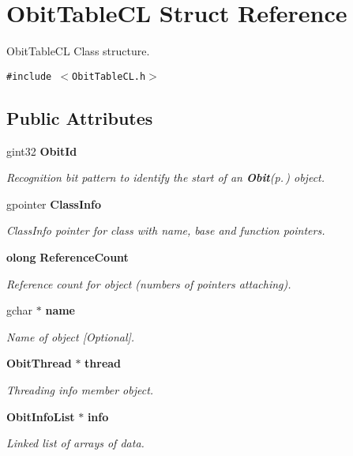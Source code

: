 \section{Obit\-Table\-CL Struct Reference}
\label{structObitTableCL}
Obit\-Table\-CL Class structure.  


{\tt \#include $<$Obit\-Table\-CL.h$>$}

\subsection*{Public Attributes}
\begin{CompactItemize}
\item 
gint32 {\bf Obit\-Id}
\begin{CompactList}\small\item\em Recognition bit pattern to identify the start of an {\bf Obit}{\rm (p.\,\pageref{structObit})} object. \item\end{CompactList}\item 
gpointer {\bf Class\-Info}
\begin{CompactList}\small\item\em Class\-Info pointer for class with name, base and function pointers. \item\end{CompactList}\item 
{\bf olong} {\bf Reference\-Count}
\begin{CompactList}\small\item\em Reference count for object (numbers of pointers attaching). \item\end{CompactList}\item 
gchar $\ast$ {\bf name}
\begin{CompactList}\small\item\em Name of object [Optional]. \item\end{CompactList}\item 
{\bf Obit\-Thread} $\ast$ {\bf thread}
\begin{CompactList}\small\item\em Threading info member object. \item\end{CompactList}\item 
{\bf Obit\-Info\-List} $\ast$ {\bf info}
\begin{CompactList}\small\item\em Linked list of arrays of data. \item\end{CompactList}\item 

\end{CompactItemize}

